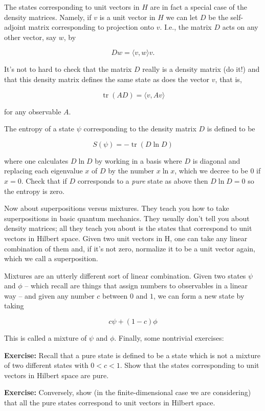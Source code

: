 \documentclass{article}
\begin{document}
The states corresponding to unit vectors in \(H\) are in fact a special
case of the density matrices. Namely, if \(v\) is a unit vector in \(H\)
we can let \(D\) be the self-adjoint matrix corresponding to projection
onto \(v\). I.e., the matrix \(D\) acts on any other vector, say \(w\),
by

\[Dw = \langle v,w \rangle v.\]

It's not to hard to check that the matrix \(D\) really is a density
matrix (do it!) and that this density matrix defines the same state as
does the vector \(v\), that is,

\[\operatorname{tr}(AD) = \langle v, Av\rangle\]

for any observable \(A\).

The entropy of a state \(\psi\) corresponding to the density matrix
\(D\) is defined to be

\[S(\psi) = -\operatorname{tr}(D \ln D)\]

where one calculates \(D \ln D\) by working in a basis where \(D\) is
diagonal and replacing each eigenvalue \(x\) of \(D\) by the number
\(x \ln x\), which we decree to be \(0\) if \(x = 0\). Check that if
\(D\) corresponds to a \emph{pure} state as above then \(D \ln D = 0\)
so the entropy is zero.

Now about superpositions versus mixtures. They teach you how to take
superpositions in basic quantum mechanics. They usually don't tell you
about density matrices; all they teach you about is the states that
correspond to unit vectors in Hilbert space. Given two unit vectors in
H, one can take any linear combination of them and, if it's not zero,
normalize it to be a unit vector again, which we call a superposition.

Mixtures are an utterly different sort of linear combination. Given two
states \(\psi\) and \(\phi\) -- which recall are things that assign
numbers to observables in a linear way -- and given any number \(c\)
between \(0\) and \(1\), we can form a new state by taking

\[c \psi + (1-c) \phi\]

This is called a mixture of \(\psi\) and \(\phi\). Finally, some
nontrivial exercises:

\textbf{Exercise:} Recall that a pure state is defined to be a state
which is not a mixture of two different states with \(0 < c < 1\). Show
that the states corresponding to unit vectors in Hilbert space are pure.

\textbf{Exercise:} Conversely, show (in the finite-dimensional case we
are considering) that all the pure states correspond to unit vectors in
Hilbert space.
\end{document}
